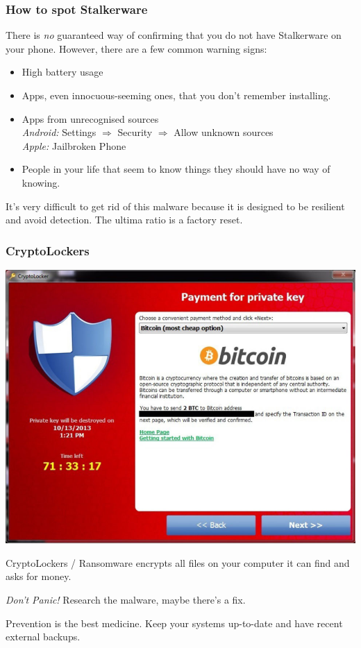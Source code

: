 \documentclass[aspectratio=169,dvipsnames]{beamer}
\begin{document}
\begin{frame}
\frametitle{How to spot Stalkerware}

There is \emph{no} guaranteed way of confirming that you do not have Stalkerware on your phone. However, there are a few common warning signs:
\bigskip

\begin{itemize}
\pause\item High battery usage
\pause\item Apps, even innocuous-seeming ones, that you don't remember installing.
\pause\item Apps from unrecognised sources\\ \emph{Android:} Settings $\Rightarrow$ Security $\Rightarrow$ Allow unknown sources\\ \emph{Apple:} Jailbroken Phone
\pause\item People in your life that seem to know things they should have no way of knowing.
\end{itemize}
\pause\bigskip

It's very difficult to get rid of this malware because it is designed to be resilient and avoid detection. The ultima ratio is a factory reset.
\end{frame}


\begin{frame}
\frametitle{CryptoLockers}
\begin{minipage}{0.6\textwidth}
\begin{center}
\includegraphics[scale=0.2]{images/cryptolocker.jpg} 
\end{center}
\end{minipage}%
\begin{minipage}{0.4\textwidth}
CryptoLockers / Ransomware encrypts all files on your computer it can find and asks for money.
\pause\medskip

\emph{Don't Panic!} Research the malware, maybe there's a fix.
\pause\medskip

Prevention is the best medicine. Keep your systems up-to-date and have recent external backups.
\end{minipage}
\end{frame}
\end{document}
